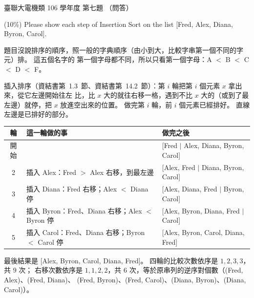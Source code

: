 \begin{pastexam}[label={px:ust-106-ee-ds-07}]{臺聯大電機類 106 學年度 第七題}
（問答）

(10\%) Please show each step of Insertion Sort on the list [Fred, Alex, Diana, Byron, Carol].
\end{pastexam}

\begin{pastsoln}
題目沒說排序的順序，照一般的字典順序（由小到大，比較字串第一個不同的字元）排。 這五個名字的
第一個字母都不同，所以只看第一個字母：A $<$ B $<$ C $<$ D $<$ F。

插入排序（資結書第~1.3~節、資結書第~14.2~節）：第 $i$ 輪把第 $i$ 個元素 $x$ 拿出來，從它左邊開始往左
比，比 $x$ 大的就往右移一格，遇到不比 $x$ 大的（或到了最左邊）就停，把 $x$ 放進空出來的位置。
做完第 $i$ 輪，前 $i$ 個元素已經排好。 直線左邊是已排好的部分。

\begin{center}
\small
\begin{tabular}{cll}
\toprule
輪 & 這一輪做的事 & 做完之後 \\
\midrule
開始 & & [Fred $|$ Alex, Diana, Byron, Carol] \\
2 & 插入 Alex：Fred $>$ Alex 右移，到最左邊 & [Alex, Fred $|$ Diana, Byron, Carol] \\
3 & 插入 Diana：Fred 右移；Alex $<$ Diana 停 & [Alex, Diana, Fred $|$ Byron, Carol] \\
4 & 插入 Byron：Fred、Diana 右移；Alex $<$ Byron 停 & [Alex, Byron, Diana, Fred $|$ Carol] \\
5 & 插入 Carol：Fred、Diana 右移；Byron $<$ Carol 停 & [Alex, Byron, Carol, Diana, Fred] \\
\bottomrule
\end{tabular}
\end{center}

最後結果是 [Alex, Byron, Carol, Diana, Fred]。 四輪的比較次數依序是 $1, 2, 3, 3$，共 $9$ 次；
右移次數依序是 $1, 1, 2, 2$，共 $6$ 次，等於原串列的逆序對個數（(Fred, Alex)、(Fred, Diana)、
(Fred, Byron)、(Fred, Carol)、(Diana, Byron)、(Diana, Carol)）。
\end{pastsoln}
